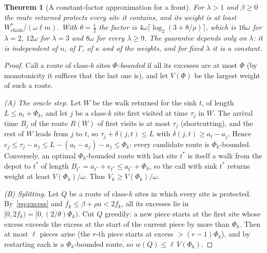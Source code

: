 \documentclass[pdflatex,sn-mathphys-ay]{sn-jnl}
\theoremstyle{thmstyleone}
\newtheorem{theorem}{Theorem}
\theoremstyle{thmstyletwo}
\theoremstyle{thmstylethree}
\begin{document}
\begin{theorem}[A constant-factor approximation for a front]\label{thm:frontapprox}
For $\lambda>1$ and $\beta\ge0$ the route returned protects every site it
contains, and its weight is at least $W^\ast_{\mathrm{chain}}/(\omega\ell m)$. With
$\theta=\tfrac12$ the factor is $4\omega\lceil\log_2(3+8/\rho)\rceil$, which
is $16\omega$ for $\lambda=2$, $12\omega$ for $\lambda=3$ and $8\omega$ for every
$\lambda\ge9$. The guarantee depends only on $\lambda$: it is independent of
$n$, of $\Gamma$, of $\kappa$ and of the weights, and for fixed $\lambda$ it is a
constant.
\end{theorem}

\begin{proof}
Call a route of class-$k$ sites \emph{$\Phi$-bounded} if all its excesses are
at most $\Phi$ (by monotonicity it suffices that the last one is), and let
$V(\Phi)$ be the largest weight of such a route.

\emph{(A) The oracle step.} Let $W$ be the walk returned for the sink $t$, of length
$L\le a_t+\Phi_k$, and let $j$ be a class-$k$ site first visited at time
$\tau_j$ in $W$. The arrival time $B_j$ of the route $R(W)$ of first visits is at
most $\tau_j$ (shortcutting), and the rest of $W$ leads from $j$ to $t$, so
$\tau_j+\delta(j,t)\le L$ with $\delta(j,t)\ge a_t-a_j$. Hence
$e_j\le\tau_j-a_j\le L-(a_t-a_j)-a_j\le\Phi_k$: every candidate route is
$\Phi_k$-bounded. Conversely, an optimal $\Phi_k$-bounded route with last site
$t^\ast$ is itself a walk from the depot to $t^\ast$ of length $B_{t^\ast}=a_{t^\ast}+e_{t^\ast}\le a_{t^\ast}+\Phi_k$,
so the call with sink $t^\ast$ returns weight at least $V(\Phi_k)/\omega$. Thus
$V_k\ge V(\Phi_k)/\omega$.

\emph{(B) Splitting.} Let $Q$ be a route of class-$k$ sites in which every site
is protected. By~\eqref{eq:excess} and $f_k\le\beta+\rho a<2f_k$, all its excesses lie in
$[0,2f_k)=[0,(2/\theta)\Phi_k)$. Cut $Q$ greedily: a new piece starts at the first
site whose excess exceeds the excess at the start of the current piece by
more than $\Phi_k$. Then at most $\ell$ pieces arise
(the $r$-th piece starts at excess $>(r-1)\Phi_k$), and by restarting each is a
$\Phi_k$-bounded route, so $w(Q)\le\ell\,V(\Phi_k)$.


\end{proof}
\end{document}
